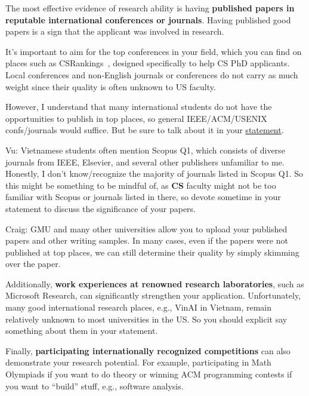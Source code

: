 \documentclass[10pt]{article}
\begin{document}
The most effective evidence of research ability is having \textbf{published papers in reputable international conferences or journals}.
Having published good papers is a sign that the applicant was involved in research.

It's important to aim for the top conferences in your field, which you can
find on places such as CSRankings~\cite{csrankings}, designed specifically to help CS PhD
applicants. Local conferences and non-English journals or conferences do
not carry as much weight since their quality is often unknown to US
faculty.

However, I understand that many international students do not have the opportunities to publish in top places, so general IEEE/ACM/USENIX confs/journals would suffice.  But be sure to talk about it in your \hyperref[sec:research-statement]{statement}.

\begin{tcolorbox}[left=1pt,right=1pt,top=1pt,bottom=1pt]
Vu: Vietnamese students often mention Scopus Q1, which consists of diverse journals from IEEE, Elsevier, and several other publishers unfamiliar to me.  Honestly, I don't know/recognize the majority of journals listed in Scopus Q1. So this might be something to be mindful of, as \textbf{CS} faculty might not be too familiar with Scopus or journals listed in there, so devote sometime in your statement to discuss the significance of your papers.
\end{tcolorbox}

\begin{tcolorbox}[left=1pt,right=1pt,top=1pt,bottom=1pt]
Craig: GMU and many other universities allow you to upload your published papers and other writing samples. In many cases, even if the papers were not published at top places, we can still determine their quality by simply skimming over the paper.  
\end{tcolorbox}

Additionally, \textbf{work experiences at renowned research laboratories}, such as Microsoft Research, can significantly strengthen your
application.  Unfortunately, many good international research places, e.g., VinAI in Vietnam, remain relatively unknown to most universities in the US. So you should explicit say something about them in your statement.

Finally, \textbf{participating internationally recognized competitions} can also demonstrate your research potential.
For example, participating in Math Olympiads if you want to do theory or  winning ACM programming contests if you want to ``build'' stuff, e.g., software analysis.
\end{document}

